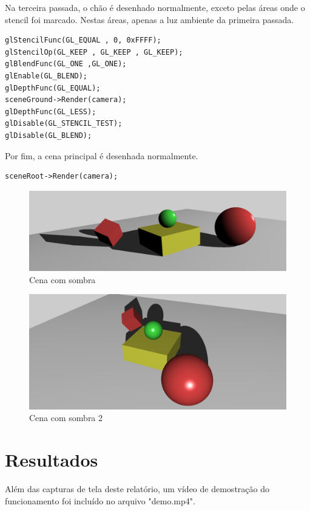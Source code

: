 \documentclass[11pt, a4paper]{article}
\begin{document}
Na terceira passada, o chão é desenhado normalmente, exceto pelas áreas onde o 
stencil foi marcado. Nestas áreas, apenas a luz ambiente da primeira passada.

\begin{verbatim}
glStencilFunc(GL_EQUAL , 0, 0xFFFF);
glStencilOp(GL_KEEP , GL_KEEP , GL_KEEP);
glBlendFunc(GL_ONE ,GL_ONE);
glEnable(GL_BLEND);
glDepthFunc(GL_EQUAL);
sceneGround->Render(camera);
glDepthFunc(GL_LESS);
glDisable(GL_STENCIL_TEST);
glDisable(GL_BLEND);
\end{verbatim}

Por fim, a cena principal é desenhada normalmente.

\begin{verbatim}
sceneRoot->Render(camera);
\end{verbatim}

\begin{figure}[H]
  \begin{center}
  \includegraphics[width=0.8\linewidth]{shadow.png}
  \caption{Cena com sombra}
  \label{fig:vaz}
  \end{center}
\end{figure}

\begin{figure}[H]
  \begin{center}
  \includegraphics[width=0.8\linewidth]{shadow-2.png}
  \caption{Cena com sombra 2}
  \label{fig:vaz}
  \end{center}
\end{figure}

\section {Resultados}

Além das capturas de tela deste relatório, um vídeo de demostração do funcionamento 
foi incluído no arquivo "demo.mp4".
\end{document}
